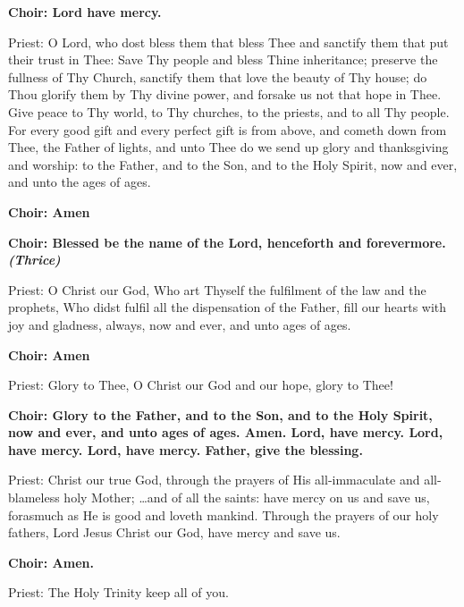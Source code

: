 \documentclass[12pt,a4paper,titlepage]{report}
\begin{document}
\begin{paracol}[1]{2}
    \textbf {Choir: Lord have mercy.}

    Priest: O Lord, who dost bless them that bless Thee and sanctify them that put their trust in Thee: Save Thy people and bless Thine inheritance; preserve the fullness of Thy Church, sanctify them that love the beauty of Thy house; do Thou glorify them by Thy divine power, and forsake us not that hope in Thee. Give peace to Thy world, to Thy churches, to the priests, and to all Thy people. For every good gift and every perfect gift is from above, and cometh down from Thee, the Father of lights, and unto Thee do we send up glory and thanksgiving and worship: to the Father, and to the Son, and to the Holy Spirit, now and ever, and unto the ages of ages.

    \textbf {Choir: Amen}

    \textbf {Choir: Blessed be the name of the Lord, henceforth and forevermore. \textit{(Thrice)}}

    Priest: O Christ our God, Who art Thyself the fulfilment of the law and the prophets, Who didst fulfil all the dispensation of the Father, fill our hearts with joy and gladness, always, now and ever, and unto ages of ages.

    \textbf {Choir: Amen}

    



    Priest: Glory to Thee, O Christ our God and our hope, glory to Thee!

    \textbf {Choir: Glory to the Father, and to the Son, and to the Holy Spirit, now and ever, and unto ages of ages. Amen. Lord, have mercy. Lord, have mercy. Lord, have mercy. Father, give the blessing.}

    Priest: Christ our true God, through the prayers of His all-immaculate and all-blameless holy Mother; \ldots and of all the saints: have mercy on us and save us, forasmuch as He is good and loveth mankind. Through the prayers of our holy fathers, Lord Jesus Christ our God, have mercy and save us.

    \textbf {Choir: Amen.}

    Priest: The Holy Trinity keep all of you.


\end{paracol}
\end{document}

